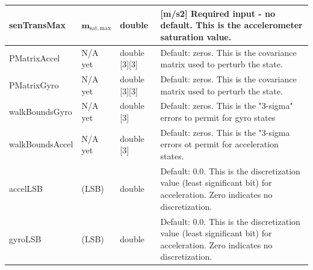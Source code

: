 \begin{table}[H]
\begin{tabular}{ | m{3cm}| m{3cm} | m{3cm} | m{6cm} |}
		senTransMax & $\mathbf{m}_{\mathrm{sat,max}}$ & double & [m/s2] Required input - no default. This is the accelerometer saturation value. \\ \hline
		PMatrixAccel & N/A yet & double [3][3] & Default: zeros. This is the covariance matrix used to perturb the state. \\ \hline
		PMatrixGyro & N/A yet & double [3][3] & Default: zeros. This is the covariance matrix used to perturb the state. \\ \hline
		walkBoundsGyro & N/A yet& double [3] & Default: zeros. This is the "3-sigma" errors to permit for gyro states \\ \hline
		walkBoundsAccel & N/A yet & double [3] & Default: zeros. This is the "3-sigma errors ot permit for acceleration states. \\ \hline
		accelLSB & (LSB) & double & Default: 0.0. This is the discretization value (least significant bit) for acceleration. Zero indicates no discretization. \\ \hline
		gyroLSB & (LSB)  & double & Default: 0.0. This is the discretization value (least significant bit) for acceleration. Zero indicates no discretization. \\ \hline
	\end{tabular}
	\label{tabular:vars}
\end{table}